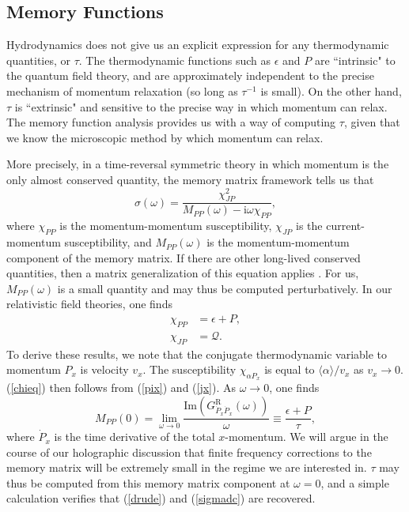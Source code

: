\documentclass[10pt, oneside]{book}
\begin{document}
\begin{doublespace}
\section{Memory Functions} \label{sec3} 
Hydrodynamics does not give us an explicit expression for any thermodynamic quantities, or $\tau$.   The thermodynamic functions such as $\epsilon$ and $P$ are ``intrinsic" to the quantum field theory, and are approximately independent to the precise mechanism of momentum relaxation (so long as $\tau^{-1}$ is small).   On the other hand, $\tau$ is ``extrinsic" and sensitive to the precise way in which momentum can relax.   The memory function analysis provides us with a way of computing $\tau$, given that we know the microscopic method by which momentum can relax.

More precisely, in a time-reversal symmetric theory in which momentum is the only almost conserved quantity, the memory matrix framework tells us that \begin{equation}
\sigma(\omega) = \frac{\chi_{JP}^2}{M_{PP}(\omega)-\mathrm{i}\omega \chi_{PP}}, \label{sigmamm}
\end{equation}where $\chi_{PP}$ is the momentum-momentum susceptibility, $\chi_{JP}$ is the current-momentum susceptibility, and $M_{PP}(\omega)$ is the momentum-momentum component of the memory matrix.    If there are other long-lived conserved quantities, then a matrix generalization of this equation applies \cite{forster1995}.   For us, $M_{PP}(\omega)$ is a small quantity and may thus be computed perturbatively.   In our relativistic field theories, one finds \begin{subequations}\label{chieq}\begin{align}
\chi_{PP} &= \epsilon+P, \\
\chi_{JP} &= \mathcal{Q}.
\end{align}\end{subequations}To derive these results, we note that the conjugate thermodynamic variable to momentum $P_x$ is velocity $v_x$.   The susceptibility $\chi_{\alpha P_x}$ is equal to $\langle \alpha\rangle/v_x$ as $v_x\rightarrow 0$.  (\ref{chieq}) then follows from (\ref{pix}) and (\ref{jx}).     As $\omega\rightarrow 0$, one finds \cite{Hartnoll:2012rj} \begin{equation}
M_{PP}(0) = \lim_{\omega\rightarrow 0} \frac{\mathrm{Im}\left(G^{\mathrm{R}}_{\dot{P}_x\dot{P}_x}(\omega)\right)}{\omega} \equiv \frac{\epsilon +P}{\tau},
\end{equation}where $\dot{P}_x$ is the time derivative of the total $x$-momentum.   We will argue in the course of our holographic discussion that finite frequency corrections to the memory matrix will be extremely small in the regime we are interested in.   $\tau$ may thus be computed from this memory matrix component at $\omega=0$, and a simple calculation verifies that (\ref{drude}) and (\ref{sigmadc}) are recovered.


\end{doublespace}
\end{document}
